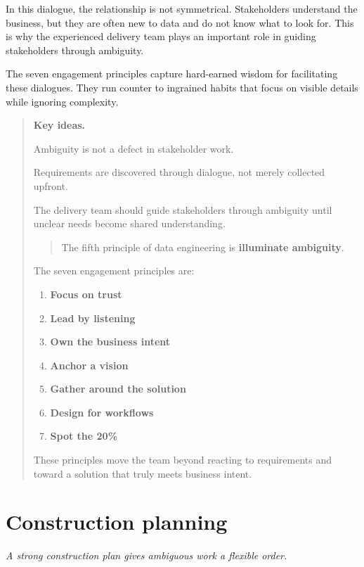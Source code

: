 \documentclass[10pt,openany,10pt]{book}
\providecommand{\tightlist}{%
  \setlength{\itemsep}{0pt}\setlength{\parskip}{0pt}}
\begin{document}
In this dialogue, the relationship is not symmetrical. Stakeholders
understand the business, but they are often new to data and do not know
what to look for. This is why the experienced delivery team plays an
important role in guiding stakeholders through ambiguity.

The seven engagement principles capture hard-earned wisdom for
facilitating these dialogues. They run counter to ingrained habits that
focus on visible details while ignoring complexity.

\begin{quote}
\textbf{Key ideas.}

Ambiguity is not a defect in stakeholder work.

Requirements are discovered through dialogue, not merely collected
upfront.

The delivery team should guide stakeholders through ambiguity until
unclear needs become shared understanding.

\begin{quote}
The fifth principle of data engineering is \textbf{illuminate
ambiguity}.
\end{quote}

The seven engagement principles are:

\begin{enumerate}
\def\labelenumi{\arabic{enumi}.}
\tightlist
\item
  \textbf{Focus on trust}
\item
  \textbf{Lead by listening}
\item
  \textbf{Own the business intent}
\item
  \textbf{Anchor a vision}
\item
  \textbf{Gather around the solution}
\item
  \textbf{Design for workflows}
\item
  \textbf{Spot the 20\%}
\end{enumerate}

These principles move the team beyond reacting to requirements and
toward a solution that truly meets business intent.
\end{quote}

\newpage

\chapter{Construction
planning}\label{docs-judgement-under-ambiguity-construction-planning}

\emph{A strong construction plan gives ambiguous work a flexible order.}
\end{document}
